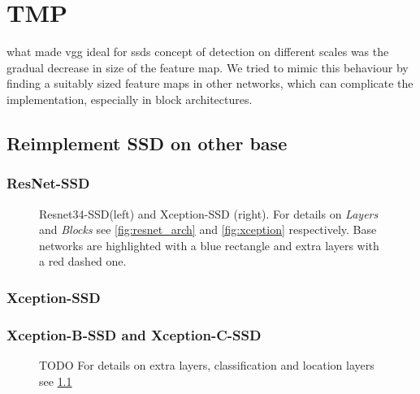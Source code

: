 \chapter{TMP}


what made vgg ideal for ssds concept of detection on different scales was the gradual decrease in size of the feature map. We tried to mimic this behaviour by finding a suitably sized feature maps in other networks, which can complicate the implementation, especially in block architectures.


\section{Reimplement SSD on other base}
\subsection{ResNet-SSD}
\begin{figure}
    \centering
    \resnetSSD
    \caption[Resnet34-SSD and Xception-SSD]%
    {Resnet34-SSD(left) and Xception-SSD (right). For details on \textit{Layers} and \textit{Blocks} see \cref{fig:resnet_arch} and \cref{fig:xception} respectively. Base networks are highlighted with a blue rectangle and extra layers with a red dashed one.}

    \label{fig:resnet_xception_SSD}
\end{figure}

\subsection{Xception-SSD}




\subsection{Xception-B-SSD and Xception-C-SSD }
\begin{figure}
\centering
    \xceptionBSSD
     \caption{TODO For details on extra layers, classification and location layers see \cref{fig:resnet_xception_SSD}}
    \label{fig:xceptionBSSD}
\end{figure}


